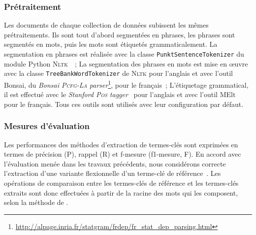       \subsubsection{Prétraitement}
      \label{subsubsec:main-automatic_keyphrase_annotation-unsupervised_automatic_keyphrase_extraction-evaluation-preprocessing}
        Les documents de chaque collection de données subissent les mêmes
        prétraitements. Ils sont tout d'abord segmentées en phrases, les phrases
        sont segmentés en mots, puis les mots sont étiquetés grammaticalement.
        La segmentation en phrases est réalisée avec la classe
        \texttt{PunktSentenceTokenizer} du module Python
        \textsc{Nltk}~\cite[\textit{Natural Language ToolKit}]{bird2009nltk}~;
        La segmentation des phrases en mots est mise en \oe{}uvre avec la classe
        \texttt{TreeBankWordTokenizer} de \textsc{Nltk} pour l'anglais et avec
        l'outil Bonsai, du \textit{Bonsai \textsc{Pcfg-La}
        parser}\footnote{\url{http://alpage.inria.fr/statgram/frdep/fr_stat_dep_parsing.html}},
        pour le français~; L'étiquetage grammatical, il est effectué avec le
        \textit{Stanford \textsc{Pos}
        tagger}~\cite{toutanova2003stanfordpostagger} pour l'anglais et avec
        l'outil MElt~\cite{denis2009melt} pour le français. Tous ces outils sont
        utilisés avec leur configuration par défaut.

      \subsubsection{Mesures d'évaluation}
      \label{subsubsec:main-automatic_keyphrase_annotation-unsupervised_automatic_keyphrase_extraction-evaluation-evaluation_measures}
        Les performances des méthodes d'extraction de termes-clés sont exprimées
        en termes de précision (P), rappel (R) et f-mesure (f1-mesure, F). En
        accord avec l'évaluation menée dans les travaux précédents, nous
        considérons correcte l'extraction d'une variante flexionnelle d'un
        terme-clé de référence~\cite{kim2010semeval}. Les opérations de
        comparaison entre les termes-clés de référence et les termes-clés
        extraits sont donc effectuées à partir de la racine des mots qui les
        composent, selon la méthode de .

